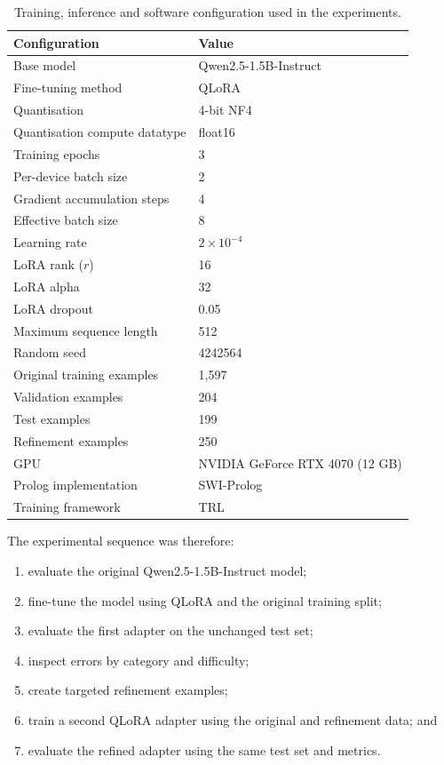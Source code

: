 \documentclass[11pt]{article} %
\theoremstyle{plain}
\theoremstyle{definition}
\begin{document}
\begin{table}[ht]
\centering
\caption{Training, inference and software configuration used in the experiments.}
\label{tab:experimental_config}
\begin{tabular}{ll}
\hline
\textbf{Configuration} & \textbf{Value} \\
\hline
Base model & Qwen2.5-1.5B-Instruct \\
Fine-tuning method & QLoRA \\
Quantisation & 4-bit NF4 \\
Quantisation compute datatype & float16 \\
Training epochs & 3 \\
Per-device batch size & 2 \\
Gradient accumulation steps & 4 \\
Effective batch size & 8 \\
Learning rate & $2 \times 10^{-4}$ \\
LoRA rank ($r$) & 16 \\
LoRA alpha & 32 \\
LoRA dropout & 0.05 \\
Maximum sequence length & 512 \\
Random seed & 4242564 \\
Original training examples & 1,597 \\
Validation examples & 204 \\
Test examples & 199 \\
Refinement examples & 250 \\
GPU & NVIDIA GeForce RTX 4070 (12 GB) \\
Prolog implementation & SWI-Prolog \\
Training framework & TRL \\
\hline
\end{tabular}
\end{table}

The experimental sequence was therefore:

\begin{enumerate}
\item evaluate the original Qwen2.5-1.5B-Instruct model;
\item fine-tune the model using QLoRA and the original training split;
\item evaluate the first adapter on the unchanged test set;
\item inspect errors by category and difficulty;
\item create targeted refinement examples;
\item train a second QLoRA adapter using the original and refinement data; and
\item evaluate the refined adapter using the same test set and metrics.
\end{enumerate}
\end{document}
